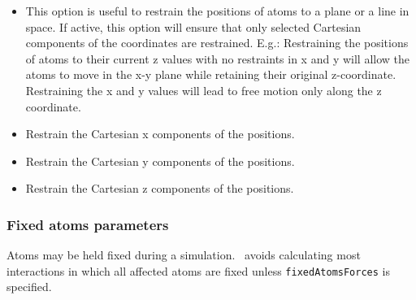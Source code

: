 \begin{itemize}
\item
{}
{This option is useful to restrain the positions of atoms to a plane or a line in space. If active,
 this option will ensure that only selected Cartesian components of the coordinates are restrained.
 E.g.: Restraining the positions of atoms to their current z values with no restraints
 in x and y will allow the atoms to move in the x-y plane while retaining their original z-coordinate.
 Restraining the x and y values will lead to free motion only along the z coordinate.}

\item
{}
{Restrain the Cartesian x components of the positions.}
\item
{}
{Restrain the Cartesian y components of the positions.}
\item
{}
{Restrain the Cartesian z components of the positions.}

\end{itemize}

\subsubsection{Fixed atoms parameters}

Atoms may be held fixed during a simulation.  \NAMD\ avoids calculating most interactions in which all affected atoms are fixed unless {\tt fixedAtomsForces} is specified.


